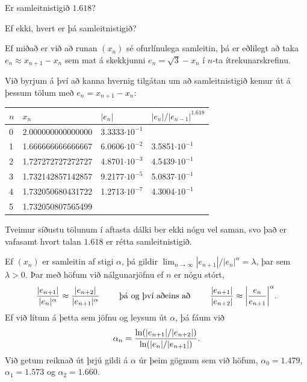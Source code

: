 \documentclass[A4paper,10pt,icelandic]{sphinxmanual}
\begin{document}
Er samleitnistigið \(1.618\)?

Ef ekki, hvert er þá samleitnistigið?

Ef miðað er við að runan \((x_n)\) sé ofurlínulega
samleitin, þá er eðlilegt að taka \(e_n\approx x_{n+1}-x_n\) sem mat
á skekkjunni \(e_n=\sqrt 3-x_n\) í \(n\)-ta ítrekunarskrefinu.

Við byrjum á því að kanna hvernig tilgátan um að samleitnistigið kemur
út á þessum tölum með \(e_n=x_{n+1}-x_n\):

\begin{tabular}{|l|l|l|l|}
\hline
\textsf{\relax 
\(n\)
} & \textsf{\relax 
\(x_n\)
} & \textsf{\relax 
\(|e_n|\)
} & \textsf{\relax 
\(|e_n|/|e_{n-1}|^{1.618}\)
}\\
\hline
0
 & 
2.000000000000000
 & 
3.3333\(\cdot 10^{-1}\)
 & \\
\hline
1
 & 
1.666666666666667
 & 
6.0606\(\cdot 10^{-2}\)
 & 
3.5851\(\cdot 10^{-1}\)
\\
\hline
2
 & 
1.727272727272727
 & 
4.8701\(\cdot 10^{-3}\)
 & 
4.5439\(\cdot 10^{-1}\)
\\
\hline
3
 & 
1.732142857142857
 & 
9.2177\(\cdot 10^{-5}\)
 & 
5.0837\(\cdot 10^{-1}\)
\\
\hline
4
 & 
1.732050680431722
 & 
1.2713\(\cdot 10^{-7}\)
 & 
4.3004\(\cdot 10^{-1}\)
\\
\hline
5
 & 
1.732050807565499
 &  & \\
\hline\end{tabular}

Tveimur síðustu tölunum í aftasta dálki ber ekki nógu vel saman, svo það
er vafasamt hvort talan \(1.618\) er rétta samleitnistigið.

Ef \((x_n)\) er samleitin af stigi \(\alpha\), þá gildir
\(\lim_{n\to \infty}|e_{n+1}|/|e_n|^\alpha=\lambda\), þar sem
\(\lambda>0\). Þar með höfum við nálgunarjöfnu ef \(n\) er nógu
stórt,
\begin{gather}
\begin{split}\dfrac{|e_{n+1}|}{|e_n|^\alpha} \approx
    \dfrac{|e_{n+2}|}{|e_{n+1}|^\alpha}
    \qquad \text{ þá og því aðeins að } \qquad
    \dfrac{|e_{n+1}|}{|e_{n+2}|} \approx
    \bigg|\dfrac{e_{n}}{e_{n+1}} \bigg|^\alpha.\end{split}\notag
\end{gather}
Ef við lítum á þetta sem jöfnu og leysum út \(\alpha\), þá fáum við
\begin{gather}
\begin{split}\alpha_n =
    \dfrac{\ln(|e_{n+1}|/|e_{n+2}|)}{\ln(|e_{n}|/|e_{n+1}|)}.\end{split}\notag
\end{gather}
Við getum reiknað út þrjú gildi á \(\alpha\) úr þeim gögnum sem við
höfum, \(\alpha_0= 1.479\), \(\alpha_1 = 1.573\) og
\(\alpha_2=1.660\).
\end{document}
